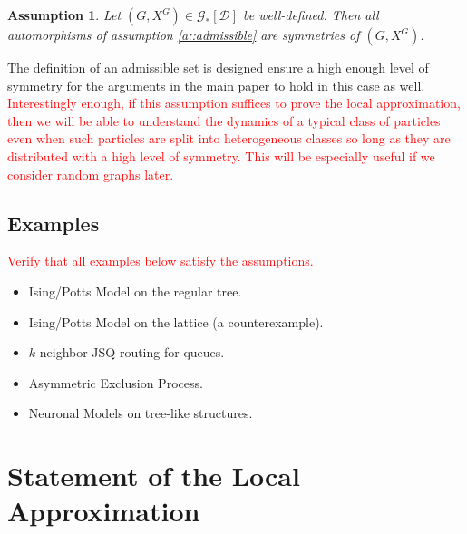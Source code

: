 \documentclass[12pt]{article}
\newcommand{\mc}{\mathcal}
\newcommand{\tr}{\textcolor{red}}
\newcommand{\cad}{\mc{D}}							%
\newcommand{\Xf}{X}									%
\newcommand{\gind}[1]{^{#1}}						%
\newcommand{\Gs}{\mc{G}_\ast}						%
\renewcommand{\sp}[1]{[#1]}							%
\newtheorem{assu}{Assumption}
\begin{document}
\begin{assu}
Let \((G,\Xf\gind{G}) \in \Gs\sp{\cad}\) be well-defined. Then all automorphisms of assumption \ref{a::admissible} are symmetries of \((G,\Xf\gind{G})\).
\label{a::padmin}
\end{assu}

The definition of an admissible set is designed ensure a high enough level of symmetry for the arguments in the main paper to hold in this case as well. \tr{Interestingly enough, if this assumption suffices to prove the local approximation, then we will be able to understand the dynamics of a typical class of particles even when such particles are split into heterogeneous classes so long as they are distributed with a high level of symmetry. This will be especially useful if we consider random graphs later.}

\subsection{Examples}
\label{e::not}

\tr{Verify that all examples below satisfy the assumptions. }

\begin{itemize}
\item Ising/Potts Model on the regular tree.

\item Ising/Potts Model on the lattice (a counterexample).

\item \(k\)-neighbor JSQ routing for queues.

\item Asymmetric Exclusion Process.

\item Neuronal Models on tree-like structures.
\end{itemize}


\section{Statement of the Local Approximation}
\label{Main}
\end{document}
